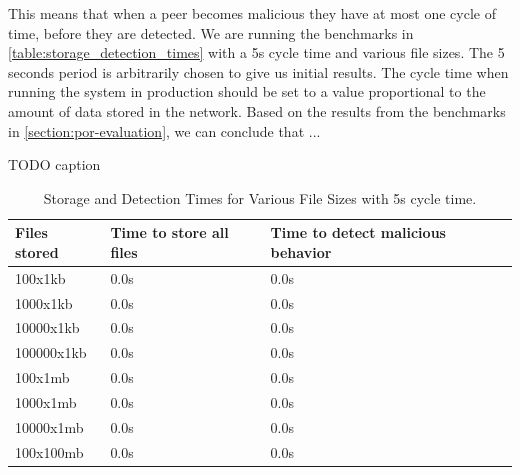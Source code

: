 This means that when a peer becomes malicious they have at most one cycle of time,
before they are detected.
We are running the benchmarks in \autoref{table:storage_detection_times} with a 5s cycle time
and various file sizes.
The 5 seconds period is arbitrarily chosen to give us initial results.
The cycle time when running the system in production should be set to a value proportional to
the amount of data stored in the network.
Based on the results from the benchmarks in \autoref{section:por-evaluation},
we can conclude that ...


\begin{table}
  \myfloatalign
  \caption{TODO caption}
  \label{tab:pretty-table}
\end{table}


\begin{table}[h!]
\centering
\begin{tabular}{|>{\centering\arraybackslash}m{4cm}|>{\centering\arraybackslash}m{4cm}|>{\centering\arraybackslash}m{4cm}|}
\hline
\textbf{Files stored} & \textbf{Time to store all files} & \textbf{Time to detect malicious behavior} \\ \hline
100x1kb & 0.0s & 0.0s \\ \hline
1000x1kb & 0.0s & 0.0s \\ \hline
10000x1kb & 0.0s & 0.0s \\ \hline
100000x1kb & 0.0s & 0.0s \\ \hline
100x1mb & 0.0s & 0.0s \\ \hline
1000x1mb & 0.0s & 0.0s \\ \hline
10000x1mb & 0.0s & 0.0s \\ \hline
100x100mb & 0.0s & 0.0s \\ \hline
\end{tabular}
\caption{Storage and Detection Times for Various File Sizes with 5s cycle time.}
\label{table:storage_detection_times}
\end{table}

